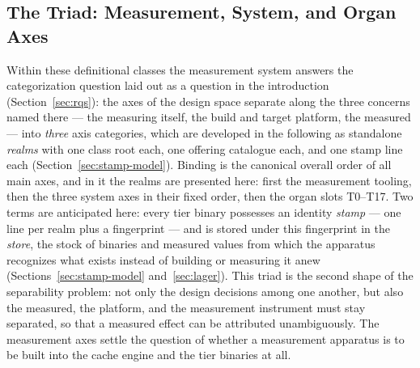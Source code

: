 \begin{nurlang}
\subsection{The Triad: Measurement, System, and Organ Axes}\label{sec:axis-triad}
Within these definitional classes the measurement system answers the categorization question laid out as a
question in the introduction (Section~\ref{sec:rqs}): the axes of the design space separate
along the three concerns named there --- the measuring itself, the build and target platform, the
measured --- into \emph{three} axis categories, which are developed in the following as standalone \emph{realms}
with one class root each, one offering catalogue each, and one stamp line each
(Section~\ref{sec:stamp-model}). Binding is the canonical overall order
of all main axes, and in it the realms are presented here: first the measurement tooling, then the
three system axes in their fixed order, then the organ slots T0--T17. Two terms are anticipated
here: every tier binary possesses an identity \emph{stamp} --- one line per realm plus a
fingerprint --- and is stored under this fingerprint in the \emph{store}, the stock of binaries
and measured values from which the apparatus recognizes what exists instead of building or measuring it anew
(Sections~\ref{sec:stamp-model} and~\ref{sec:lager}). This triad is the second shape of the
separability problem: not only the design decisions among one another, but also the measured, the
platform, and the measurement instrument must stay separated, so that a measured effect can be attributed
unambiguously. The measurement axes settle the question of whether a measurement apparatus is to be built into the cache engine and the tier binaries at all.
\end{nurlang}
